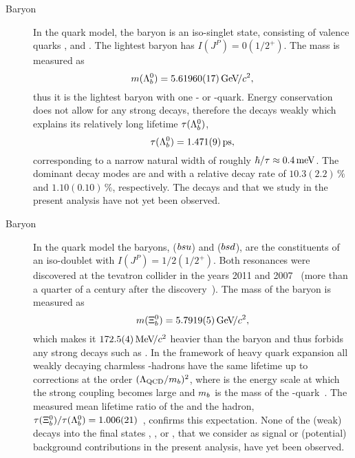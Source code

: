 \begin{description}
    \item[\Lb Baryon] In the quark model, the \Lb baryon is an iso-singlet state, consisting of valence quarks \uquark, \dquark and \bquark. The lightest \Lb baryon has $I(J^P) = 0(1/2^+)$. The mass is measured as
    \begin{equation*}
        m({{\Lambda}^0_{b}}) = 5.61960(17){\mathrm{\,Ge\kern -0.1em V\!/}c^2},
    \end{equation*}
    thus it is the lightest baryon with one \bquark- or \bquarkbar-quark. Energy conservation does not allow for any strong decays, therefore the \Lb decays weakly which explains its relatively long lifetime $\tau({{\Lambda}^0_{b}})$,
    \begin{equation*}
        \tau({{\Lambda}^0_{b}}) = 1.471(9) \,\text{ps},
    \end{equation*}
    corresponding to a narrow natural width of roughly $\hbar / \tau \approx \SI{0.4}{\milli\electron\volt}$. The dominant decay modes are \decay{\Lb}{\Lc\ellm\neulb} and \decay{\Lb}{\Lc\Dsm} with a relative decay rate of $10.3(2.2)\,\%$ and $1.10(0.10)\,\%$, respectively. The decays \decay{\Lb}{\PD\Lz} and \decay{\Lb}{\Dstar\Lz} that we study in the present analysis have not yet been observed.
    \item[\Xibz Baryon] In the quark model the \Xib baryons, \Xibz (${b}{s}{u}$) and \Xibm (${b}{s}{d}$), are the constituents of an iso-doublet with $I(J^P) = 1/2(1/2^+)$. Both resonances were discovered at the \gls{tevatron} collider in the years 2011 and 2007~\cite{Xibzdisc,Xibmdisc1,Xibmdisc2} (more than a quarter of a century after the \Lb discovery~\cite{Lbdisc}). The mass of the \Xibz baryon is measured as 
    \begin{equation*}
        m({{\Xi}^0_{b}}) = 5.7919(5){\mathrm{\,Ge\kern -0.1em V\!/}c^2},
    \end{equation*}
    which makes it $172.5(4){\mathrm{\,Me\kern -0.1em V\!/}c^2}$ heavier than the \Lb baryon and thus forbids any strong decays such as \decay{\Xibz}{\Lb\Kzb}. In the framework of heavy quark expansion all weakly decaying charmless \bquark-hadrons have the same lifetime up to corrections at the order $({\Lambda_{\mathrm{QCD}}}/m_{{b}})^2$, where \lqcd is the energy scale at which the strong coupling becomes large and $m_{{b}}$ is the mass of the \bquark-quark~\cite{rtXibztLb_theory}. The measured mean lifetime ratio of the \Xibz and the \Lb hadron, $\tau({{\Xi}^0_{b}}) / \tau({{\Lambda}^0_{b}}) = 1.006(21)$~\cite{fXibzfLb}, confirms this expectation. None of the (weak) decays into the final states \Dz\Lz, \Dstar\Lz, \Dz\Sz or \Dz\Xiz, that we consider as signal or (potential) background contributions in the present analysis, have yet been observed.

\end{description}

